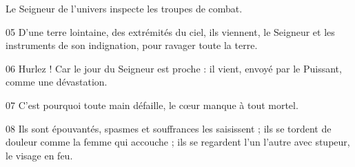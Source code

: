 
Le Seigneur de l’univers inspecte les troupes de combat.

05 D’une terre lointaine, des extrémités du ciel, ils viennent, le Seigneur et les instruments de son indignation, pour ravager toute la terre.

06 Hurlez ! Car le jour du Seigneur est proche : il vient, envoyé par le Puissant, comme une dévastation.

07 C’est pourquoi toute main défaille, le cœur manque à tout mortel.

08 Ils sont épouvantés, spasmes et souffrances les saisissent ; ils se tordent de douleur comme la femme qui accouche ; ils se regardent l’un l’autre avec stupeur, le visage en feu.
